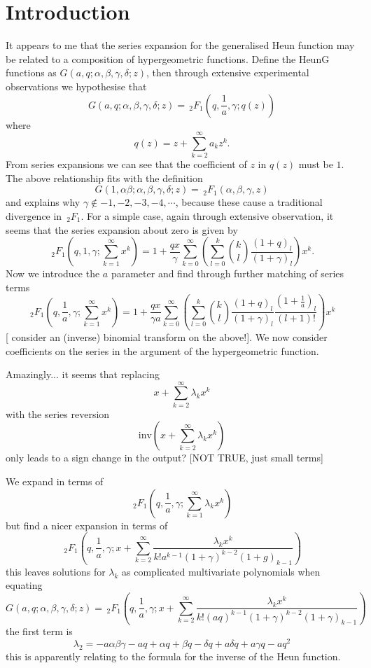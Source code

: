 \documentclass{article}
\begin{document}
\section{Introduction}
It appears to me that the series expansion for the generalised Heun function may be related to a composition of hypergeometric functions. Define the HeunG functions as $G(a,q;\alpha,\beta,\gamma,\delta;z)$, then through extensive experimental observations we hypothesise that
\begin{equation}
G(a,q;\alpha,\beta,\gamma,\delta;z) = \,_2F_1\left(q,\frac{1}{a},\gamma; q(z)\right)
\end{equation}
where 
$$
q(z) = z + \sum_{k=2}^\infty a_k z^k.
$$
From series expansions we can see that the coefficient of $z$ in $q(z)$ must be $1$. The above relationship fits with the definition
$$
G(1,\alpha \beta; \alpha, \beta, \gamma, \delta; z) = \,_2F_1(\alpha,\beta,\gamma,z)
$$
and explains why $\gamma \notin {-1,-2,-3,-4,\cdots}$, because these cause a traditional divergence in $\,_2F_1$. For a simple case, again through extensive observation, it seems that the series expansion about zero is given by
\begin{equation}
\,_2F_1\left(q,1,\gamma;\sum_{k=1}^\infty x^k\right) = 1 + \frac{q x}{\gamma}  \sum_{k=0}^\infty \left(\sum_{l=0}^k \binom{k}{l} \frac{(1+q)_l}{(1+\gamma)_l}\right)x^k.
\end{equation}
Now we introduce the $a$ parameter and find through further matching of series terms
\begin{equation}
\,_2F_1\left(q,\frac{1}{a},\gamma;\sum_{k=1}^\infty x^k\right) = 1 + \frac{q x}{\gamma a}  \sum_{k=0}^\infty \left(\sum_{l=0}^k \binom{k}{l} \frac{(1+q)_l}{(1+\gamma)_l} \frac{(1+\frac{1}{a})_l}{(l+1)!}\right)x^k
\end{equation}
[{\color{red} consider an (inverse) binomial transform on the above!}]. We now consider coefficients on the series in the argument of the hypergeometric function.


Amazingly... it seems that replacing
$$
x + \sum_{k=2}^\infty \lambda_k x^k
$$
with the series reversion
$$
\mathrm{inv}\left(x + \sum_{k=2}^\infty \lambda_k x^k\right)
$$
only leads to a sign change in the output? [NOT TRUE, just small terms]

We expand in terms of 
$$
\,_2F_1\left(q,\frac{1}{a},\gamma;\sum_{k=1}^\infty \lambda_k x^k\right)
$$
but find a nicer expansion in terms of 
$$
\,_2F_1\left(q,\frac{1}{a},\gamma;x + \sum_{k=2}^\infty \frac{\lambda_k x^k}{k! a^{k-1}(1+\gamma)^{k-2}(1+g)_{k-1}}\right)
$$
this leaves solutions for $\lambda_k$ as complicated multivariate polynomials when equating 
$$
G(a,q;\alpha,\beta,\gamma,\delta;z) = \,_2F_1\left(q,\frac{1}{a},\gamma;x + \sum_{k=2}^\infty \frac{\lambda_k x^k}{k! (aq)^{k-1}(1+\gamma)^{k-2}(1+\gamma)_{k-1}}\right)
$$
the first term is 
$$
\lambda_2 = -a \alpha \beta \gamma - a q + \alpha q + \beta q - \delta q + a \delta q + a \gamma q - a q^2
$$
this is apparently relating to the formula for the inverse of the Heun function.
\end{document}
